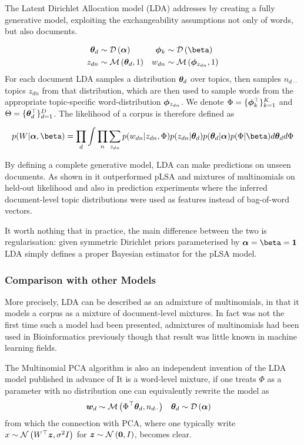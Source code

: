 The Latent Dirichlet Allocation model\cite{BleiNgJordan2003} (LDA) addresses by creating a fully generative model, exploiting the exchangeability assumptions not only of words, but also documents.

\begin{align}
\thd & \sim \dir{\vv{\alpha}} & \pk & \sim \dir{\vv{\beta}} \\
z_{dn} & \sim \muln{\thd}{1} & w_{dn} & \sim \muln{\vv{\phi}_{z_{dn}}}{1}
\end{align}
For each document LDA samples a distribution ${ \bm \theta_d }$ over topics, then samples $n_{d\cdot\cdot}$ topics $z_{dn}$ from that distribution, which are then used to sample words from the appropriate topic-specific word-distribution $\bm \phi_{z_{dn}}$. We denote $\Phi = \{ \bm \phi_k^\top \}_{k=1}^K$ and $\Theta = \{ \bm \theta_d^\top \}_{d=1}^D$. The likelihood of a corpus is therefore defined as

\begin{align}
p(W | \vv{\alpha}, \vv{\beta}) = \prod_d \int \prod_n \sum_{z_{dn}} p(w_{dn}|z_{dn}, \Phi)p(z_{dn}|\thd)p(\thd|\vv{\alpha})p(\Phi|\vv{\beta}) d\thd d\Phi
\end{align}

By defining a complete generative model, LDA can make predictions on unseen documents. As shown in \cite{BleiNgJordan2003} it outperformed pLSA and mixtures of multinomials on held-out likelihood and also in prediction experiments where the inferred document-level topic distributions were used as features instead of bag-of-word vectors.

It worth nothing that in practice, the main difference between the two is regularisation: given symmetric Dirichlet priors parameterised by $\vv{\alpha} = \vv{\beta} = \vv{1}$ LDA simply defines a proper Bayesian estimator for the pLSA model\cite{GiKa2003}.

\subsubsection{Comparison with other Models}
More precisely, LDA can be described as an admixture of multinomials, in that it models a corpus as a mixture of document-level mixtures. In fact \cite{BleiNgJordan2003} was not the first time such a model had been presented,  admixtures of multinomials had been used in Bioinformatics previously\cite{Pritchard2000} though that result was little known in machine learning fields. 

The Multinomial PCA algorithm\cite{Buntine2002} is also an independent invention of the LDA model published in advance of \cite{BleiNgJordan2003} It is a word-level mixture, if one treats $\Phi$ as a parameter with no distribution one can equivalently rewrite the model as
\begin{align}
{  \bm w _d } & \sim \mathcal{M} \left( {\Phi^\top{  \bm \theta _d }},{n_{d\cdot\cdot}} \right) & { \bm \theta_d } & \sim \mathcal{D} \left( {\bm \alpha} \right)
\end{align}
from which the connection with PCA, where one typically write $x \sim \mathcal{N} \left( {W^\top\bm z}, {\sigma^2 I} \right)$ for $\bm z \sim \mathcal{N} \left( {\bm 0}, {I} \right)$, becomes clear.

